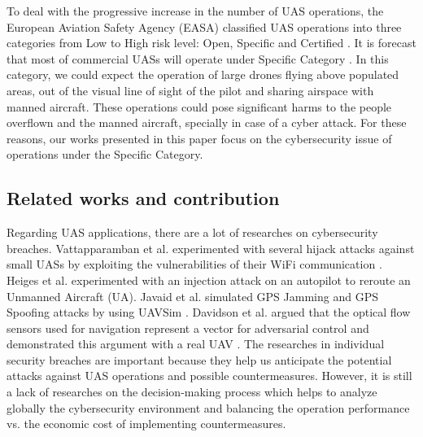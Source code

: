 \documentclass[a4paper, 10, conference]{ieeeconf}  %
\begin{document}
To deal with the progressive increase in the number of UAS operations, the European Aviation Safety Agency (EASA) classified UAS operations into three categories from Low to High risk level: Open, Specific and Certified \cite{A-NPA2015}. It is forecast that most of commercial UASs will operate under Specific Category \cite{EDOS2016}. In this category, we could expect the operation of large drones flying above populated areas, out of the visual line of sight of the pilot and sharing airspace with manned aircraft. These operations could pose significant harms to the people overflown and the manned aircraft, specially in case of a cyber attack. For these reasons, our works presented in this paper focus on the cybersecurity issue of operations under the Specific Category.



\subsection {Related works and contribution}

Regarding UAS applications, there are a lot of researches on cybersecurity breaches. Vattapparamban et al. experimented with several hijack attacks against small UASs by exploiting the vulnerabilities of their WiFi communication \cite{vattapparamban_drones_2016}. Heiges et al. \cite{heiges_how_nodate} experimented with an injection attack on an autopilot to reroute an Unmanned Aircraft (UA). Javaid et al. simulated GPS Jamming and GPS Spoofing attacks by using UAVSim \cite{10.1177/0037549716685874}. Davidson et al. argued that the optical flow sensors used for navigation represent a vector for adversarial control and demonstrated this argument with a real UAV \cite{198490}. The researches in individual security breaches are important because they help us anticipate the potential attacks against UAS operations and possible countermeasures. However, it is still a lack of researches on the decision-making process which helps to analyze globally the cybersecurity environment and balancing the operation performance vs. the economic cost of implementing countermeasures. 
\end{document}
